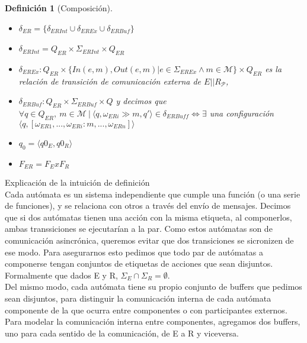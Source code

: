 \documentclass[paper=a4, fontsize=11pt, spanish]{scrartcl} %
\numberwithin{equation}{section} %
\numberwithin{figure}{section} %
\numberwithin{table}{section} %
\newtheorem{definition}{Definición}
\begin{document}
\begin{definition}[Composición]
\begin{itemize}
\item $\delta_{ER} = \{ \delta_{ER \mathit{Int}} \cup \delta_{ER\mathit{Ex}} \cup \delta_{ER\mathit{Buf}}\}$
\item $\delta_{ER\mathit{Int}} = Q_{ER} \times \Sigma_{ER\mathit{Int}} \times Q_{ER} $
\item $\delta_{ER\mathit{Ex}}: Q_{ER} \times \{\mathit{In}(e,m), \mathit{Out}(e,m) | e \in \Sigma_{ER\mathit{Ex}} \land m \in \mathcal{M}\} \times Q_{ER}$ es la relación de transición de comunicación externa de $E||R_\mathcal{P}$,
\item $\delta_{ER\mathit{Buf}}: Q_{ER} \times \Sigma_{ER\mathit{Buf}} \times Q$ y decimos que $\forall q \in Q_\mathit{ER}, \ m \in \mathcal{M} \ |	 \ \langle q, \omega_\mathit{ERi} \gg m, q' \rangle \in \delta_\mathit{ERBuff} \iff \exists$ una configuración $ \langle q, [\omega_\mathit{ER1},...,\omega_\mathit{ERi}:m, ..., \omega_\mathit{ERn}] \rangle$ 

\item $q_0 = \langle q0_E,q0_R \rangle$
\item $F_{ER} = F_E x F_R$

\end{itemize}
\end{definition}


Explicación de la intuición de definición \\

Cada autómata es un sistema independiente que cumple una función (o una serie de funciones), y se relaciona con otros a través del envío de mensajes. Decimos que si dos autómatas tienen una acción con la misma etiqueta, al componerlos, ambas transsiciones se ejecutarían a la par. Como estos autómatas son de comunicación asincrónica, queremos evitar que dos transiciones se sicronizen de ese modo. Para asegurarnos esto pedimos que todo par de autómatas a componerse tengan conjuntos de etiquetas de acciones que sean disjuntos. Formalmente que dados E y R, $\Sigma_E \cap \Sigma_R = \emptyset$. \\

Del mismo modo, cada autómata tiene su propio conjunto de buffers que pedimos sean disjuntos, para distinguir la comunicación interna de cada autómata componente de la que ocurra entre componentes o con participantes externos. Para modelar la comunicación interna entre componentes, agregamos dos buffers, uno para cada sentido de la comunicación, de E a R y viceversa.\\
\end{document}
